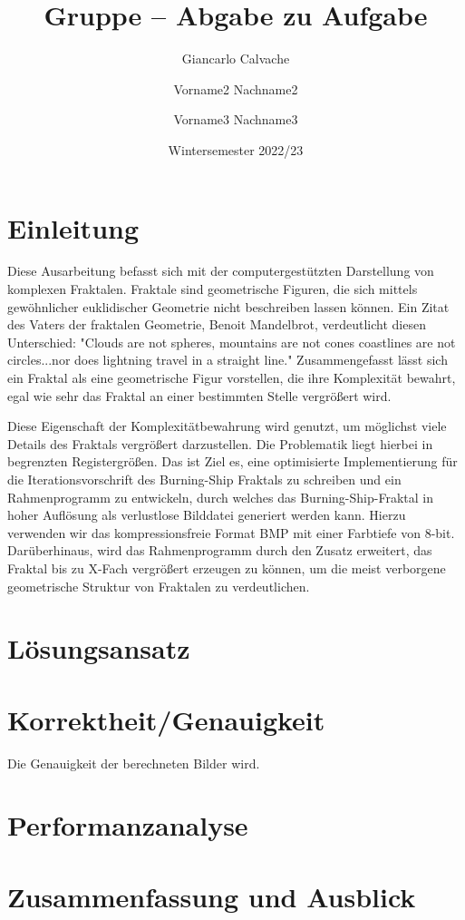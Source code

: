 \documentclass[course=erap]{aspdoc}
\author{Giancarlo Calvache \and Vorname2 Nachname2 \and Vorname3 Nachname3}
\date{Wintersemester 2022/23} %
\title{Gruppe \theGroup{} -- Abgabe zu Aufgabe \theNumber}
\begin{document}
\maketitle

\section{Einleitung}

Diese Ausarbeitung befasst sich mit der computergestützten Darstellung von komplexen Fraktalen.
Fraktale sind geometrische Figuren, die sich mittels gewöhnlicher euklidischer Geometrie nicht beschreiben lassen können.
Ein Zitat des Vaters der fraktalen Geometrie, Benoit Mandelbrot, verdeutlicht diesen Unterschied: "Clouds are not spheres, mountains are not cones
coastlines are not circles...nor does lightning travel in a straight line."
Zusammengefasst lässt sich ein Fraktal als eine geometrische Figur vorstellen, die ihre Komplexität bewahrt,
egal wie sehr das Fraktal an einer bestimmten Stelle vergrößert wird.

Diese Eigenschaft der Komplexitätbewahrung wird genutzt, um möglichst viele Details des Fraktals vergrößert darzustellen.
Die Problematik liegt hierbei in begrenzten Registergrößen.
Das ist Ziel es, eine optimisierte Implementierung für die Iterationsvorschrift des Burning-Ship Fraktals zu schreiben und ein Rahmenprogramm zu entwickeln,
durch welches das Burning-Ship-Fraktal in hoher Auflösung als verlustlose Bilddatei generiert werden kann. Hierzu verwenden wir das kompressionsfreie Format BMP mit einer Farbtiefe von 8-bit. Darüberhinaus, wird das Rahmenprogramm durch den
Zusatz erweitert, das Fraktal bis zu X-Fach vergrößert erzeugen zu können, um die meist verborgene geometrische Struktur von Fraktalen zu verdeutlichen.

\section{Lösungsansatz}


\section{Korrektheit/Genauigkeit}

Die Genauigkeit der berechneten Bilder wird.

\section{Performanzanalyse}


\section{Zusammenfassung und Ausblick}


{}
\end{document}

